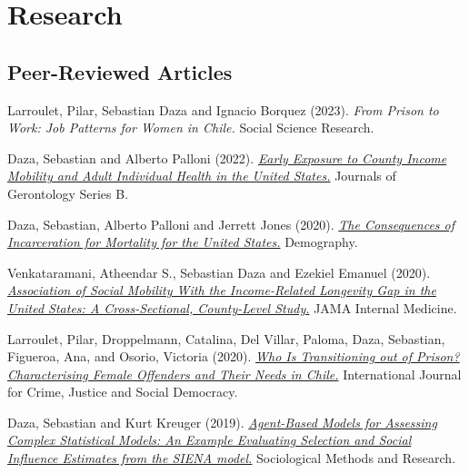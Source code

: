 \documentclass[10pt,letterpaper]{article}
\renewenvironment{itemize}{
  \begin{list}{}{
    \setlength{\leftmargin}{1.5em}
    \setlength{\itemsep}{0.25em}
    \setlength{\parskip}{0pt}
    \setlength{\parsep}{0.25em}
  }
}{
  \end{list}
}
\begin{document}
\section*{Research}

\subsection*{Peer-Reviewed Articles}

\begin{itemize}

\item Larroulet, Pilar, Sebastian Daza and Ignacio Borquez (2023).
  {\textit{From Prison to Work: Job Patterns for Women in Chile.} 
  Social Science Research.}


\item Daza, Sebastian and Alberto Palloni (2022).
  \textit{\href{https://academic.oup.com/psychsocgerontology/advance-article/doi/10.1093/geronb/gbab240/6519680?guestAccessKey=42f4029e-6430-4752-8f31-188b10a75141}{Early Exposure to County Income Mobility and Adult Individual Health in the United States.}
  }
  Journals of Gerontology Series B.

\item Daza, Sebastian, Alberto Palloni and Jerrett Jones (2020).
  \textit{\href{https://rdcu.be/b278V}
  {The Consequences of Incarceration for Mortality for the United States.}
  }
  Demography.

\item Venkataramani, Atheendar S., Sebastian Daza and Ezekiel Emanuel (2020).
  \textit{
  \href{https://jamanetwork.com/journals/jamainternalmedicine/fullarticle/2759132}
  {Association of Social Mobility With the Income-Related Longevity Gap in the United States: A Cross-Sectional, County-Level Study.}
  }
 JAMA Internal Medicine.


\item Larroulet, Pilar, Droppelmann, Catalina, Del Villar, Paloma, Daza, Sebastian, Figueroa, Ana, and Osorio, Victoria (2020).
    \textit{
  \href{https://www.crimejusticejournal.com/article/view/1467}
  {Who Is Transitioning out of Prison? Characterising Female Offenders and Their Needs in Chile.}
  }
International Journal for Crime, Justice and Social Democracy.

 \item Daza, Sebastian and Kurt Kreuger (2019).
  \textit{
  \href{https://doi.org/10.1177/0049124119826147}
  {Agent-Based Models for Assessing Complex Statistical Models: An Example Evaluating Selection and Social Influence Estimates from the SIENA model.}
  }
 Sociological Methods and Research.


\end{itemize}
\end{document}
